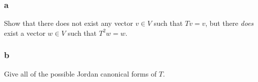\hypertarget{a-115}{%
\subsubsection{a}\label{a-115}}

Show that there does not exist any vector \(v\in V\) such that
\(Tv = v\), but there \emph{does} exist a vector \(w\in V\) such that
\(T^2 w= w\).

\hypertarget{b-105}{%
\subsubsection{b}\label{b-105}}

Give all of the possible Jordan canonical forms of \(T\).


\printbibliography[title=Bibliography]



